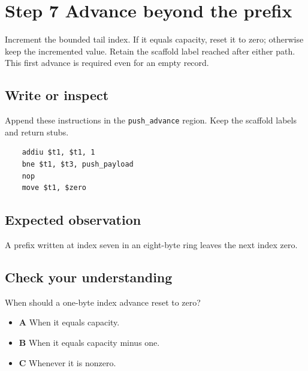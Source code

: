 \section{Step 7 Advance beyond the prefix}\label{ring-s07}

Increment the bounded tail index. If it equals capacity, reset it to zero; otherwise keep the incremented value. Retain the scaffold label reached after either path. This first advance is required even for an empty record.

\subsection{Write or inspect}
Append these instructions in the \texttt{push\_advance} region. Keep the scaffold labels and return stubs.

\begin{verbatim}
    addiu $t1, $t1, 1
    bne $t1, $t3, push_payload
    nop
    move $t1, $zero
\end{verbatim}

\subsection{Expected observation}
A prefix written at index seven in an eight-byte ring leaves the next index zero.

\subsection{Check your understanding}
When should a one-byte index advance reset to zero?

\begin{itemize}
  \item \textbf{A} When it equals capacity.
  \item \textbf{B} When it equals capacity minus one.
  \item \textbf{C} Whenever it is nonzero.
\end{itemize}
